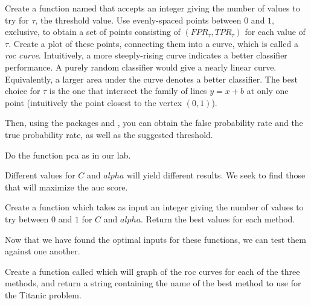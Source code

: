 \begin{problem}
Create a function named  that accepts an integer  giving the number of values to try for $\tau$, the threshold value.  Use  evenly-spaced points between $0$ and $1$, exclusive, to obtain a set of  points consisting of $(FPR_{\tau},TPR_{\tau})$ for each value of $\tau$.  Create a plot of these points, connecting them into a curve, which is called a \emph{roc curve}.  Intuitively, a more steeply-rising curve indicates a better classifier performance.  A purely random classifier would give a nearly linear curve.  Equivalently, a larger area under the curve denotes a better classifier.  The best choice for $\tau$ is the one that intersect the family of lines $y=x+b$ at only one point (intuitively the point closest to the vertex $(0, 1)$).  
\end{problem}

Then, using the  packages  and , you can obtain the false probability rate and the true probability rate, as well as the suggested threshold.

\begin{problem}
Do the function pca as in our lab.
\end{problem}

Different values for $C$ and $alpha$ will yield different results.  We seek to find those that will maximize the auc score.
\begin{problem}
Create a function  which takes as input an integer giving the number of values to try between $0$ and $1$ for $C$ and $alpha$.  Return the best values for each method.
\end{problem}

Now that we have found the optimal inputs for these functions, we can test them against one another.
\begin{problem}
Create a function called  which will graph of the roc curves for each of the three methods, and return a string containing the name of the best method to use for the Titanic problem.
\end{problem}
